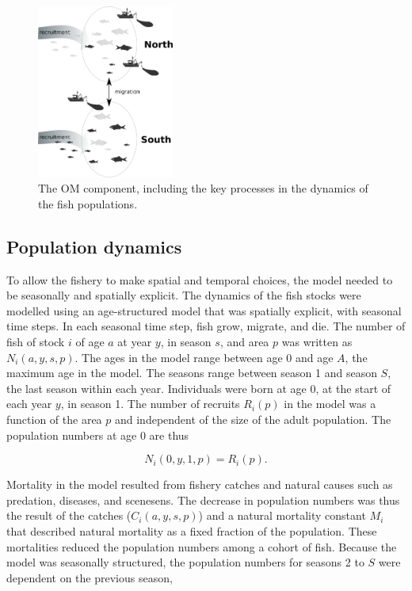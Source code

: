 \documentclass[12pt,oneline,a4paper,numbib]{ouparticle}
\numberwithin{equation}{subsection} %
\begin{document}
\begin{figure}[!h]
\centering
\includegraphics[width=0.4\textwidth]{Figures/Areadynamics.eps} 
\caption{The OM component, including the key processes in the dynamics of the fish populations.}
\label{fig:stockdyn}
\end{figure}

\subsection{Population dynamics}


To allow the fishery to make spatial and temporal choices, the model needed to be seasonally and spatially explicit. The dynamics of the fish stocks were modelled using an age-structured model that was spatially explicit, with seasonal time steps. In each seasonal time step, fish grow, migrate, and die. The number of fish of stock $i$ of age $a$ at year $y$, in season $s$, and area $p$ was written as $N_i (a, y, s, p)$.  The ages in the model range between age 0 and age $A$, the maximum age in the model. The seasons range between season 1 and season $S$, the last season within each year. Individuals were born at age 0, at the start of each year $y$, in season 1. The number of recruits $R_i (p)$ in the model was a function of the area $p$ and independent of the size of the adult population. The population numbers at age 0 are thus
 
\begin{equation}
N_i (0, y, 1, p) = R_i (p).
\end{equation}

Mortality in the model resulted from fishery catches and natural causes such as predation, diseases, and scenesens. The decrease in population numbers was thus the result of the catches ($C_i (a, y, s, p)$) and a natural mortality constant $M_i$ that described natural mortality as a fixed fraction of the population. These mortalities reduced the population numbers among a cohort of fish. Because the model was seasonally structured, the population numbers for seasons 2 to $S$ were dependent on the previous season,
\end{document}
